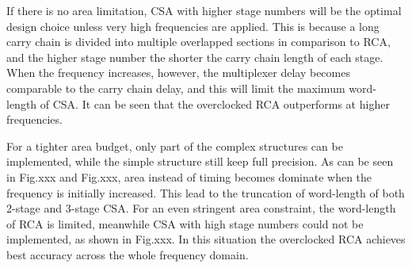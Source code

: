 \documentclass[journal]{IEEEtran}
\begin{document}

If there is no area limitation, CSA with higher stage numbers will be the optimal design choice unless very high frequencies are applied. This is because a long carry chain is divided into multiple overlapped sections in comparison to RCA, and the higher stage number the shorter the carry chain length of each stage. When the frequency increases, however, the multiplexer delay becomes comparable to the carry chain delay, and this will limit the maximum word-length of CSA. It can be seen that the overclocked RCA outperforms at higher frequencies.

For a tighter area budget, only part of the complex structures can be implemented, while the simple structure still keep full precision. As can be seen in Fig.xxx and Fig.xxx, area instead of timing becomes dominate when the frequency is initially increased. This lead to the truncation of word-length of both 2-stage and 3-stage CSA. For an even stringent area constraint, the word-length of RCA is limited, meanwhile CSA with high stage numbers could not be implemented, as shown in Fig.xxx. In this situation the overclocked RCA achieves best accuracy across the whole frequency domain.
\end{document}
